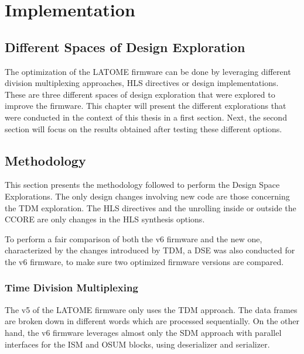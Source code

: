 \chapter{Implementation}\label{ch:implementation}

\section{Different Spaces of Design Exploration}

The optimization of the LATOME firmware can be done by leveraging different division multiplexing approaches, HLS directives or design implementations. These are three different spaces of design exploration that were explored to improve the firmware. This chapter will present the different explorations that were conducted in the context of this thesis in a first section. Next, the second section will focus on the results obtained after testing these different options.


\section{Methodology}

This section presents the methodology followed to perform the Design Space Explorations. The only design changes involving new code are those concerning the TDM exploration. The HLS directives and the unrolling inside or outside the CCORE are only changes in the HLS synthesis options.

To perform a fair comparison of both the v6 firmware and the new one, characterized by the changes introduced by TDM, a DSE was also conducted for the v6 firmware, to  make sure two optimized firmware versions are compared.

\subsection{Time Division Multiplexing}

The v5 of the LATOME firmware only uses the TDM approach. The data frames are broken down in different words which are processed sequentially. On the other hand, the v6 firmware leverages almost only the SDM approach with parallel interfaces for the ISM and OSUM blocks, using deserializer and serializer.

